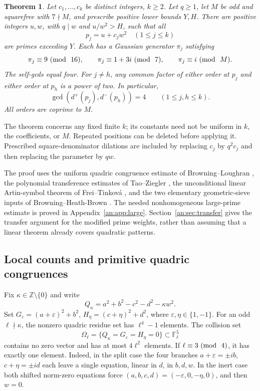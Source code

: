 \documentclass[11pt,reqno]{amsart}
\newtheorem{theorem}{Theorem}[section]
\theoremstyle{definition}
\numberwithin{equation}{section}
\newcommand{\eps}{\varepsilon}
\newcommand{\Z}{\mathbb Z}
\newcommand{\F}{\mathbb F}
\def\mo{{\rm{mod}\ }}
\def\pmod#1{\ (\mo\ #1)}
\begin{document}
\begin{theorem}\label{an:thm:patterns}
Let $c_1,\ldots,c_k$ be distinct integers, $k\ge2$. Let $q\ge1$, let $M$ be odd and squarefree with $7\nmid M$, and prescribe positive lower bounds $Y,H$. There are positive integers $u,w$, with $q\mid w$ and $u/w^2>H$, such that all
\[
 p_j=u+c_jw^2\quad(1\le j\le k)
\]
are primes exceeding $Y$. Each has a Gaussian generator $\pi_j$ satisfying
\begin{equation}\label{an:eq:ray}
 \pi_j\equiv9\pmod{16},\qquad
 \pi_j\equiv1+3i\pmod7,\qquad
 \pi_j\equiv i\pmod M.
\end{equation}
The self-gcds equal four. For $j\ne h$, any common factor of either order at $p_j$ and either order at $p_h$ is a power of two. In particular,
\begin{equation}\label{an:eq:allcross}
 \gcd(d^+(p_j),d^-(p_h))=4\qquad(1\le j,h\le k).
\end{equation}
All orders are coprime to $M$.
\end{theorem}

The theorem concerns any fixed finite $k$; its constants need not be uniform in $k$, the coefficients, or $M$. Repeated positions can be deleted before applying it. Prescribed square-denominator dilations are included by replacing $c_j$ by $q^2c_j$ and then replacing the parameter by $qw$.

The proof uses the uniform quadric congruence estimate of Browning--Loughran \cite[Theorem 4.1]{BL}, the polynomial transference estimates of Tao--Ziegler \cite{TZpoly}, the unconditional linear Artin-symbol theorem of Frei--Tinkov\'a \cite[Theorem 1.4]{FT}, and the two elementary geometric-sieve inputs of Browning--Heath-Brown \cite[Lemmas 2.1 and 4.1]{BHB}. The needed nonhomogeneous large-prime estimate is proved in Appendix~\ref{an:app:large}. Section~\ref{an:sec:transfer} gives the transfer argument for the modified prime weights, rather than assuming that a linear theorem already covers quadratic patterns.

\subsection{Local counts and primitive quadric congruences}\label{an:sec:counts}
Fix $\kappa\in\Z\setminus\{0\}$ and write
\begin{equation}\label{an:eq:quadric}
 Q_\kappa=a^2+b^2-c^2-d^2-\kappa w^2.
\end{equation}
Set $G_\eps=(a+\eps)^2+b^2$, $H_\eta=(c+\eta)^2+d^2$, where $\eps,\eta\in\{1,-1\}$. For an odd $\ell\nmid\kappa$, the nonzero quadric residue set has $\ell^4-1$ elements. The collision set
\[
 \Omega_\ell=\{Q_\kappa=G_\eps=H_\eta=0\}\subset\F_\ell^5
\]
contains no zero vector and has at most $4\ell^2$ elements. If $\ell\equiv3\pmod4$, it has exactly one element. Indeed, in the split case the four branches $a+\eps=\pm ib$, $c+\eta=\pm id$ each leave a single equation, linear in $d$, in $b,d,w$. In the inert case both shifted norm-zero equations force $(a,b,c,d)=(-\eps,0,-\eta,0)$, and then $w=0$.
\end{document}

